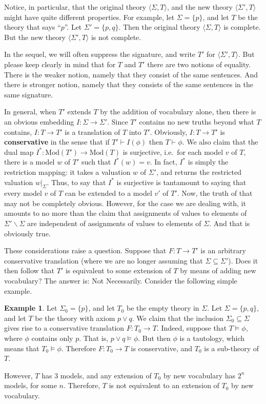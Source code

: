 \documentclass[11pt]{article}
\theoremstyle{definition}
\newtheorem*{example}{Example}
\theoremstyle{remark}
\begin{document}
Notice, in particular, that the original theory $\langle \Sigma
,T\rangle$, and the new theory $\langle \Sigma ',T\rangle$ might have
quite different properties.  For example, let $\Sigma = \{ p \}$, and
let $T$ be the theory that says ``$p$''.  Let $\Sigma '=\{ p,q\}$.
Then the original theory $\langle \Sigma ,T\rangle$ is complete.  But
the new theory $\langle \Sigma ',T\rangle$ is not complete.

In the sequel, we will often suppress the signature, and write $T'$
for $\langle \Sigma ',T\rangle$.  But please keep clearly in mind that
for $T$ and $T'$ there are two notions of equality.  There is the
weaker notion, namely that they consist of the same sentences.  And
there is stronger notion, namely that they consists of the same
sentences in the same signature.

In general, when $T'$ extends $T$ by the addition of vocabulary alone,
then there is an obvious embedding $I:\Sigma\to\Sigma '$.  Since $T'$
contains no new truths beyond what $T$ contains, $I:T\to T'$ is a
translation of $T$ into $T'$.  Obviously, $I:T\to T'$ is
\textbf{conservative} in the sense that if $T'\vdash I(\phi )$ then
$T\vdash \phi$.  We also claim that the dual map
$I^*:\mathrm{Mod}(T')\to \mathrm{Mod}(T)$ is surjective, i.e.\ for
each model $v$ of $T$, there is a model $w$ of $T'$ such that
$I^*(w)=v$.  In fact, $I^*$ is simply the restriction mapping: it
takes a valuation $w$ of $\Sigma '$, and returns the restricted
valuation $w|_{\Sigma}$.  Thus, to say that $I^*$ is surjective is
tantamount to saying that every model $v$ of $T$ can be extended to a
model $v'$ of $T'$.  Now, the truth of that may not be completely
obvious.  However, for the case we are dealing with, it amounts to no
more than the claim that assignments of values to elements of $\Sigma
'\backslash \Sigma$ are independent of assignments of values to
elements of $\Sigma$.  And that is obviously true.

These considerations raise a question.  Suppose that $F:T\to T'$ is an
arbitrary conservative translation (where we are no longer assuming
that $\Sigma \subseteq\Sigma '$).  Does it then follow that $T'$ is
equivalent to some extension of $T$ by means of adding new vocabulary?
The answer is: Not Necessarily.  Consider the following simple
example.

\begin{example} Let $\Sigma _0= \{ p \}$, and let $T _0$ be the empty
  theory in $\Sigma$.  Let $\Sigma =\{ p,q\}$, and let $T$ be the
  theory with axiom $p\vee q$.  We claim that the inclusion $\Sigma
  _0\subseteq\Sigma$ gives rise to a conservative translation
  $F:T_0\to T$.  Indeed, suppose that $T\vDash \phi$, where $\phi$
  contains only $p$.  That is, $p\vee q\vDash \phi$.  But then $\phi$
  is a tautology, which means that $T_0\vDash \phi$.  Therefore
  $F:T_0\to T$ is conservative, and $T_0$ is a sub-theory of $T$.

  However, $T$ has $3$ models, and any extension of $T_0$ by new
  vocabulary has $2^n$ models, for some $n$.  Therefore, $T$ is not
  equivalent to an extension of $T_0$ by new vocabulary.
\end{example}
\end{document}
